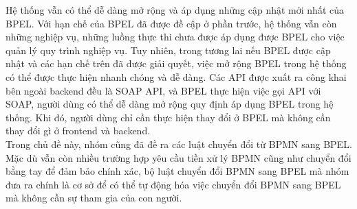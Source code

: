 Hệ thống vẫn có thể dễ dàng mở rộng và áp dụng những cập nhật mới nhất của BPEL. Với hạn chế của BPEL đã được đề cập ở phần trước, hệ thống vẫn còn những nghiệp vụ, những luồng thực thi chưa được áp dụng được BPEL cho việc quản lý quy trình nghiệp vụ. Tuy nhiên, trong tương lai nếu BPEL được cập nhật và các hạn chế trên đã được giải quyết, việc mở rộng BPEL trong hệ thống có thể được thực hiện nhanh chóng và dễ dàng. Các API được xuất ra công khai bên ngoài backend đều là SOAP API, và BPEL thực hiện việc gọi API với SOAP, người dùng có thể dễ dàng mở rộng quy định áp dụng BPEL trong hệ thống. Khi đó, người dùng chỉ cần thực hiện thay đổi ở BPEL mà không cần thay đổi gì ở frontend và backend.\\


Trong chủ đề này, nhóm cũng đã đề ra các luật chuyển đổi từ BPMN sang BPEL. Mặc dù vẫn còn nhiều trường hợp yêu cầu tiền xử lý BPMN cũng như chuyển đổi bằng tay để đảm bảo chính xác, bộ luật chuyển đổi BPMN sang BPEL mà nhóm đưa ra chính là cơ sở để có thể tự động hóa việc chuyển đổi BPMN sang BPEL mà không cần sự tham gia của con người.


